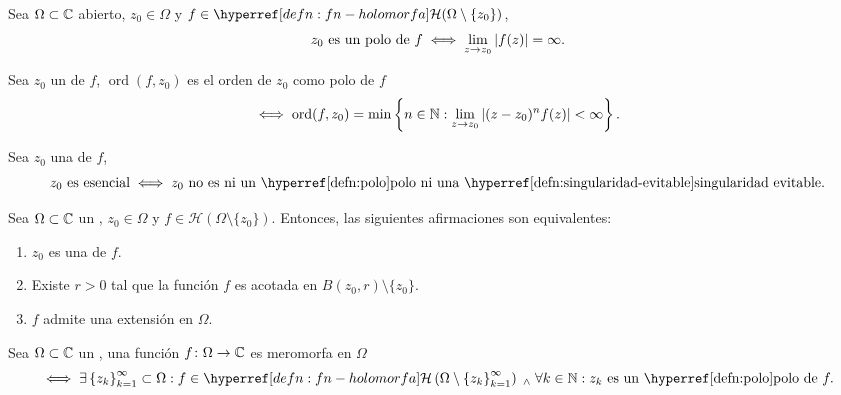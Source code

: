 
\begin{defn}[Polo]\label{defn:polo-fn-meromorfa}
    Sea $\Omega \subset \mathbb{C}$ abierto, $z_0 \in \Omega$ y $f \in \exhyperref[defn:fn-holomorfa]{fn-holomorfa}{\mathcal{H}}(\Omega \setminus \{z_0\})$,
    \[
    z_0 \text{ es un polo de } f \iff \lim_{z \to z_0} \left|f(z)\right| = \infty.
    \]
\end{defn}

\begin{defn}\label{defn:orden-polo-fn-meromorfa}
    Sea $z_0$ un  de $f$, $\operatorname{ord}(f, z_0)$ es el orden de $z_0$ como polo de $f$
    \[
    \iff \operatorname{ord}(f, z_0) = \min \left\{ n \in \mathbb{N} : \lim_{z \to z_0} \left|(z - z_0)^n f(z)\right| < \infty \right\}.
    \]
\end{defn}

\begin{defn}\label{defn:singularidad-esencial}
    Sea $z_0$ una  de $f$, 
    \[
    z_0 \tex{ es esencial} \iff z_0 \text{ no es ni un \exhyperref[defn:polo]{polo}{polo} ni una \exhyperref[defn:singularidad-evitable]{singularidad-evitable}{singularidad evitable}.}
    \]
\end{defn}

\begin{teo}[de Riemann]\label{teo:singularidad-evitable-riemann}
    Sea $\Omega \subset \mathbb{C}$ un , $z_0 \in \Omega$ y $f \in \mathcal{H}(\Omega \setminus \{z_0\})$. Entonces, las siguientes afirmaciones son equivalentes:
    \begin{enumerate}[label=\textnormal{(\roman*)}]
        \item $z_0$ es una  de $f$.
        \item Existe $r > 0$ tal que la función $f$ es {acotada} en $B(z_0, r) \setminus \{z_0\}$.
        \item $f$ admite una extensión  en $\Omega$.
    \end{enumerate}
\end{teo}

\begin{defn}\label{defn:fn-meromorfa}
    Sea $\Omega \subset \mathbb{C}$ un , una función $f \colon \Omega \to \mathbb{C}$ es meromorfa en $\Omega$ 
    \[
    \iff \exists \left\{z_k\right\}_{k=1}^{\infty} \subset \Omega : f \in \exhyperref[defn:fn-holomorfa]{fn-holomorfa}{\mathcal{H}}\left(\Omega \setminus \left\{z_k\right\}_{k=1}^{\infty}\right) \we \forall k \in \N : z_k \tex{ es un \exhyperref[defn:polo]{polo}{polo} de } f.
    \]
\end{defn}

